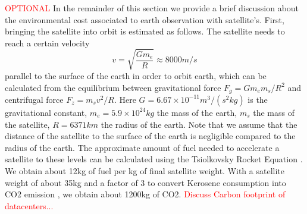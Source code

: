 \textcolor{red}{OPTIONAL}
In the remainder of this section we provide a brief discussion about the environmental cost associated to earth observation with satellite's. First, bringing the satellite into orbit is estimated as follows. The satellite needs to reach a certain velocity
\begin{equation}
	v = \sqrt{\frac{G m_e}{R}} \approx 8000 m/s
\end{equation}
parallel to the surface of the earth in order to orbit earth, which can be calculated from the equilibrium between gravitational force $F_g = G m_e m_s / R^2$ and centrifugal force $F_z = m_s v^2/R$. Here $G = 6.67 \times 10^{-11} m^3/(s^2 kg)$ is the gravitational constant, $m_e = 5.9 \times 10^{24} kg$ the mass of the earth, $m_s$ the mass of the satellite, $R = 6371km$ the radius of the earth.
Note that we assume that the distance of the satellite to the surface of the earth is negligible compared to the radius of the earth. The approximate amount of fuel needed to accelerate a satellite to these levels can be calculated using the Tsiolkovsky Rocket Equation \parencite{tsiolkovsky}. We obtain about 12kg of fuel per kg of final satellite weight. With a satellite weight of about 35kg and a factor of 3 to convert Kerosene consumption into CO2 emission \parencite{fuel_to_co2}, we obtain about 1200kg of CO2.
\textcolor{red}{Discuss Carbon footprint of datacenters...}
